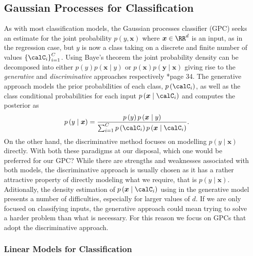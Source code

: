 \subsection{Gaussian Processes for Classification}\label{Section1.6}

As with most classification models, the Gaussian processes classifier (GPC) seeks an estimate for the joint probability $p \left( y , \bm{x} \right)$ where $\bm{x} \in \RR^d$ is an input, as in the regression case, but $y$ is now a class taking on a discrete and finite number of values $\left\{ \calC_i \right\}_{i=1}^C$. Using Baye's theorem the joint probability density can be decomposed into either $p \left( y \right) p \left( \bm{x} \mid y \right)$ or $p \left( \bm{x} \right) p \left( \bm{y} \mid \bm{x} \right)$ giving rise to the {\it generative} and {\it discriminative} approaches respectively \cite{RasmussenCarlEdward2006Gpfm}*{page 34}. The generative approach models the prior probabilities of each class, $p \left( \calC_i \right)$, as well as the class conditional probabilities for each input $p \left( \bm{x} \mid \calC_i \right)$ and computes the posterior as
\[
    p \left( y \mid \bm{x} \right) = \frac{ p \left( y \right) p \left( \bm{x} \mid y \right) }{ \sum_{i=1}^{C} p \left( \calC_i \right) p \left( \bm{x} \mid \calC_i \right) }.
\]
On the other hand, the discriminative method focuses on modelling $p \left( y \mid \bm{x} \right)$ directly. With both these paradigms at our disposal, which one would be preferred for our GPC? While there are strengths and weaknesses associated with both models, the discriminative approach is usually chosen as it has a rather attractive property of directly modeling what we require, that is $p \left( y \mid \bm{x} \right)$. Aditionally, the density estimation of $p \left( \bm{x} \mid \calC_i \right)$ using in the generative model presents a number of difficulties, especially for larger values of $d$. If we are only focused on classifying inputs, the generative approach could mean trying to solve a harder problem than what is necessary. For this reason we focus on GPCs that adopt the discriminative approach.

\subsubsection{Linear Models for Classification}\label{Section1.6.1}

